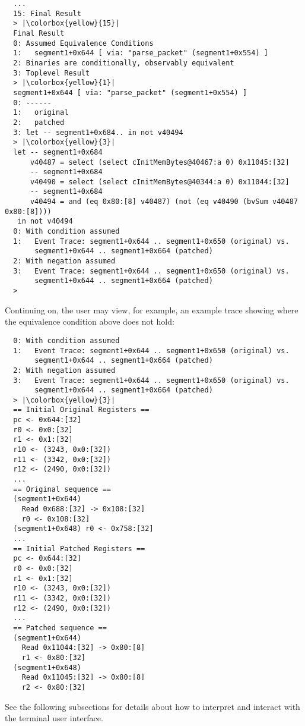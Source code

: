 \begin{lstlisting}
  ...
  15: Final Result
  > |\colorbox{yellow}{15}|
  Final Result
  0: Assumed Equivalence Conditions
  1:   segment1+0x644 [ via: "parse_packet" (segment1+0x554) ]
  2: Binaries are conditionally, observably equivalent
  3: Toplevel Result
  > |\colorbox{yellow}{1}|
  segment1+0x644 [ via: "parse_packet" (segment1+0x554) ]
  0: ------
  1:   original
  2:   patched
  3: let -- segment1+0x684.. in not v40494
  > |\colorbox{yellow}{3}|
  let -- segment1+0x684
      v40487 = select (select cInitMemBytes@40467:a 0) 0x11045:[32]
      -- segment1+0x684
      v40490 = select (select cInitMemBytes@40344:a 0) 0x11044:[32]
      -- segment1+0x684
      v40494 = and (eq 0x80:[8] v40487) (not (eq v40490 (bvSum v40487 0x80:[8])))
   in not v40494
  0: With condition assumed
  1:   Event Trace: segment1+0x644 .. segment1+0x650 (original) vs.
       segment1+0x644 .. segment1+0x664 (patched)
  2: With negation assumed
  3:   Event Trace: segment1+0x644 .. segment1+0x650 (original) vs.
       segment1+0x644 .. segment1+0x664 (patched)
  >
\end{lstlisting}

Continuing on, the user may view, for example, an example trace showing where the equivalence condition above does not hold:

\begin{lstlisting}
  0: With condition assumed
  1:   Event Trace: segment1+0x644 .. segment1+0x650 (original) vs.
       segment1+0x644 .. segment1+0x664 (patched)
  2: With negation assumed
  3:   Event Trace: segment1+0x644 .. segment1+0x650 (original) vs.
       segment1+0x644 .. segment1+0x664 (patched)
  > |\colorbox{yellow}{3}|
  == Initial Original Registers ==
  pc <- 0x644:[32]
  r0 <- 0x0:[32]
  r1 <- 0x1:[32]
  r10 <- (3243, 0x0:[32])
  r11 <- (3342, 0x0:[32])
  r12 <- (2490, 0x0:[32])
  ...
  == Original sequence ==
  (segment1+0x644)
    Read 0x688:[32] -> 0x108:[32]
    r0 <- 0x108:[32]
  (segment1+0x648) r0 <- 0x758:[32]
  ...
  == Initial Patched Registers ==
  pc <- 0x644:[32]
  r0 <- 0x0:[32]
  r1 <- 0x1:[32]
  r10 <- (3243, 0x0:[32])
  r11 <- (3342, 0x0:[32])
  r12 <- (2490, 0x0:[32])
  ...
  == Patched sequence ==
  (segment1+0x644)
    Read 0x11044:[32] -> 0x80:[8]
    r1 <- 0x80:[32]
  (segment1+0x648)
    Read 0x11045:[32] -> 0x80:[8]
    r2 <- 0x80:[32]
\end{lstlisting}

See the following subsections for details about how to interpret and interact with the terminal user interface.


